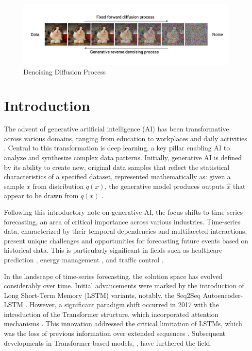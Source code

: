 \begin{figure}
    \centering
    \includegraphics[width=\textwidth]{00_images/diffusion.png}
    \caption{Denoising Diffusion Process}
    \label{fig:denoising_diffusion_process}
\end{figure}

\section{Introduction}
The advent of generative artificial intelligence (AI) has been transformative across various domains, ranging from education \cite{baidoo-anu_education_2023, qadir_engineering_2023, lim_generative_2023} to workplaces \cite{noy_experimental_2023, brynjolfsson_generative_2023} and daily activities \cite{dwivedi_opinion_2023}. Central to this transformation is deep learning, a key pillar enabling AI to analyze and synthesize complex data patterns. Initially, generative AI is defined by its ability to create new, original data samples that reflect the statistical characteristics of a specified dataset, represented mathematically as: given a sample $x$ from distribution $q(x)$, the generative model produces outputs $\hat{x}$ that appear to be drawn from $q(x)$ \cite{luo_understanding_2022}.

Following this introductory note on generative AI, the focus shifts to time-series forecasting, an area of critical importance across various industries. Time-series data, characterized by their temporal dependencies and multifaceted interactions, present unique challenges and opportunities for forecasting future events based on historical data. This is particularly significant in fields such as healthcare prediction \cite{penfold_use_2013, bui_time_2018, che_recurrent_2018, kaushik_ai_2020, chimmula_time_2020, zeroual_deep_2020}, energy management \cite{deb_review_2017, chou_forecasting_2018, wang_diffload_2023}, and traffic control \cite{lippi_short-term_2013, pavlyuk_short-term_2017}.

In the landscape of time-series forecasting, the solution space has evolved considerably over time. Initial advancements were marked by the introduction of Long Short-Term Memory (LSTM) variants, notably, the Seq2Seq Autoencoder-LSTM \cite{sutskever_sequence_2014}. However, a significant paradigm shift occurred in 2017 with the introduction of the Transformer structure, which incorporated attention mechanisms \cite{vaswani_attention_2017}. This innovation addressed the critical limitation of LSTMs, which was the loss of previous information over extended sequences \cite{murray_state---art_2023}. Subsequent developments in Transformer-based models, \cite{nguyen_temporal_2021, zhou_informer_2021, wu_autoformer_2022, zhou_fedformer_2022, zhang_crossformer_2022, nie_time_2023}, have furthered the field. 

